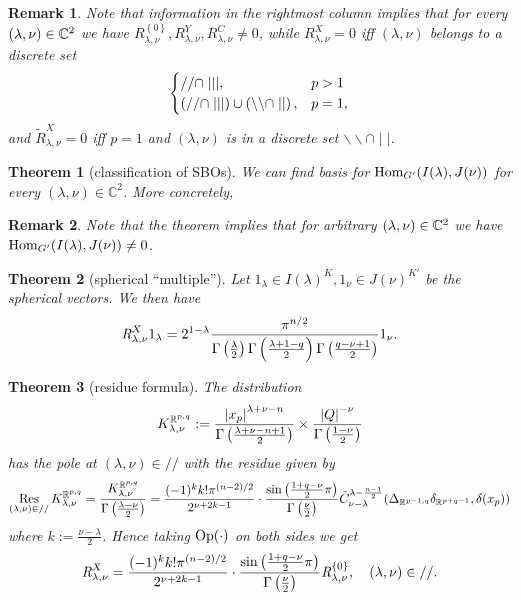 \documentclass[10pt]{article} %
\newtheorem{theorem}{Theorem}
\newcommand{\Hom}{\mbox{\normalfont Hom}}
\newtheorem{remark}{Remark}
\theoremstyle{definition}
\newcommand{\Op}{\mbox{\normalfont Op}}
\newcommand{\Res}{\operatorname{Res}\displaylimits}
\newcommand{\OpR}{\mbox{\it R}}
\begin{document}
\begin{remark}
	Note that information in the rightmost column implies that for every $(\lambda,\nu)\in\mathbb{C}^2$ we have $R_{\lambda,\nu}^{ \left\{ 0 \right\}},R_{\lambda,\nu}^Y,R_{\lambda,\nu}^C\neq0$, while
	$R^X_{\lambda,\nu}=0$ iff $(\lambda,\nu)$ belongs to a discrete set
	\[\begin{cases}
			//\cap\mid\mid\mid,&p>1\\
			\left(//\cap\mid\mid\mid\right) \cup \left(\backslash\backslash\cap\mid\mid\right),&p=1,
		\end{cases}
	\]
	and $\tilde{R}_{\lambda,\nu}^X=0$ iff $p=1$ and $(\lambda,\nu)$ is in a discrete set $\backslash\backslash\cap \mid\mid$.
\end{remark}
\begin{theorem}[classification of SBOs]
		We can find basis for $\Hom_{G'}(I(\lambda),J(\nu))$ for every $(\lambda,\nu)\in \mathbb{C}^2$. More concretely,
\end{theorem}
\begin{remark}
	Note that the theorem implies that for arbitrary $(\lambda,\nu)\in\mathbb{C}^2$ we have $\Hom_{G'}(I(\lambda),J(\nu))\neq0$.
\end{remark}
\begin{theorem}[spherical ``multiple'']
	Let $1_\lambda\in I(\lambda)^K,1_\nu\in J(\nu)^{K'}$ be the spherical vectors. We then have
\[ \OpR^X_{\lambda, \nu} 1_{\lambda} = 2^{1 -
\lambda} \frac{\pi^{n / 2}}{\Gamma \left( \frac{\lambda}{2} \right)
\Gamma \left(  \frac{\lambda + 1-q}{2} \right) \Gamma \left(
\frac{q - \nu + 1}{2} \right)} 1_{\nu}. \]
\end{theorem}
\begin{theorem}[residue formula]
		The distribution
		\[K_{\lambda,\nu}^{\mathbb{R}^{p,q}}:=\frac{\left|x_p\right|^{\lambda+\nu-n}}{\Gamma\left( \frac{\lambda+\nu-n+1}{2} \right)}\times
		\frac{\left|Q\right|^{-\nu}}{\Gamma\left( \frac{1-\nu}{2} \right)}\]
		has the pole at $(\lambda,\nu)\in//$ with the residue given by
		\[\Res_{(\lambda,\nu)\in//}K_{\lambda,\nu}^{\mathbb{R}^{p,q}}=\frac{K_{\lambda,\nu}^{\mathbb{R}^{p,q}}}{\Gamma\left( \frac{\lambda-\nu}{2} \right)}
			=\frac{ (- 1)^k k!\pi^{(n - 2) / 2} 
		}{2^{ \nu + 2 k-1}}\cdot  \frac{\sin\left( \frac{1+q-\nu}{2}\pi \right)}{\Gamma\left( \frac{\nu}{2} \right)}
	\tilde{C}_{\nu - \lambda}^{\lambda - \frac{n
  	- 1}{2}} ({\Delta}_{\mathbb{R}^{p-1,q}} {\delta}_{\mathbb{R}^{p+q-1}}, \delta (x_p))
		\]
		where $k:=\frac{\nu-\lambda}{2}$.
		Hence taking $\Op(\cdot)$ on both sides we get
  \[\OpR_{\lambda,\nu}^X  = \frac{ (- 1)^k k!\pi^{(n - 2) / 2} 
		}{2^{ \nu + 2 k-1}}\cdot  \frac{\sin\left( \frac{1+q-\nu}{2}\pi \right)}{\Gamma\left( \frac{\nu}{2} \right)}
     \OpR_{\lambda,\nu}^{ \left\{ 0 \right\} },\quad(\lambda,\nu)\in// . \]
	\end{theorem}
\end{document}

